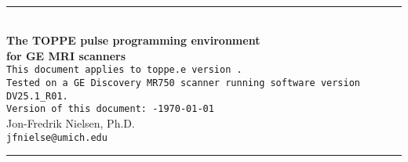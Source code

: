 

\begin{titlepage}
~\\[0.5in]
\begin{centering}
\rule{\textwidth}{5pt}
~\\[0.5in]
{\bf \huge The TOPPE pulse programming environment} \\ [0.4in]
{\bf \huge for GE MRI scanners} \\ [0.6in]
{\tt This document applies to toppe.e version~\toppeversion.   } \\ [0.1in]
{\tt Tested on a GE Discovery MR750 scanner running software version DV25.1\_R01.   } \\ [0.6in]
{\tt Version of this document:~\toppeversion-\today} \\ [1in]
{\large Jon-Fredrik Nielsen, Ph.D.} \\ [0.1in]
{\tt jfnielse@umich.edu} \\ [1.5in]
\rule{\textwidth}{5pt}
\end{centering}
\end{titlepage}


